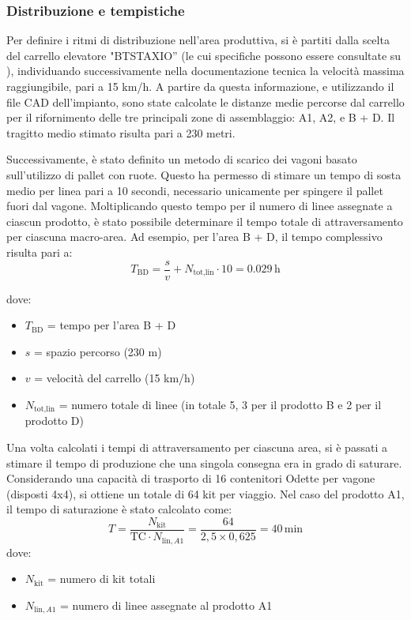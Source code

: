 \documentclass[11pt]{article}
\begin{document}
\subsubsection{Distribuzione e tempistiche}
Per definire i ritmi di distribuzione nell'area produttiva, si è partiti dalla scelta del carrello elevatore "BTSTAXIO” (le cui specifiche possono essere consultate su ), individuando successivamente nella documentazione tecnica la velocità massima raggiungibile, pari a 15 km/h. A partire da questa informazione, e utilizzando il file CAD dell'impianto, sono state calcolate le distanze medie percorse dal carrello per il rifornimento delle tre principali zone di assemblaggio: A1, A2, e B + D. Il tragitto medio stimato risulta pari a 230 metri.

Successivamente, è stato definito un metodo di scarico dei vagoni basato sull'utilizzo di pallet con ruote. Questo ha permesso di stimare un tempo di sosta medio per linea pari a 10 secondi, necessario unicamente per spingere il pallet fuori dal vagone. Moltiplicando questo tempo per il numero di linee assegnate a ciascun prodotto, è stato possibile determinare il tempo totale di attraversamento per ciascuna macro-area. Ad esempio, per l’area B + D, il tempo complessivo risulta pari a:
\begin{equation}
    T_\text{BD} = \frac{s}{v} + N_\text{tot,lin} \cdot 10 = 0.029 \, \text{h}
\end{equation}

dove:
\begin{itemize}
    \item $T_\text{BD}$ = tempo per l'area B + D
    \item $s$ = spazio percorso (230 m)
    \item $v$ = velocità del carrello (15 km/h)
    \item $N_\text{tot,lin}$ = numero totale di linee (in totale 5, 3 per il prodotto B e 2 per il prodotto D)
\end{itemize}
\newpage

Una volta calcolati i tempi di attraversamento per ciascuna area, si è passati a stimare il tempo di produzione che una singola consegna era in grado di saturare. Considerando una capacità di trasporto di 16 contenitori Odette per vagone (disposti 4x4), si ottiene un totale di 64 kit per viaggio.
Nel caso del prodotto A1, il tempo di saturazione è stato calcolato come:
\begin{equation}
    T = \frac{N_\text{kit}}{\text{TC} \cdot N_{\text{lin},A1} } = \frac{64}{2{,}5 \times 0{,}625} = 40 \, \text{min}
\end{equation}
dove:
\begin{itemize}
    \item $N_\text{kit}$ = numero di kit totali
    \item $N_{\text{lin},A1}$ = numero di linee assegnate al prodotto A1
\end{itemize}
\end{document}
